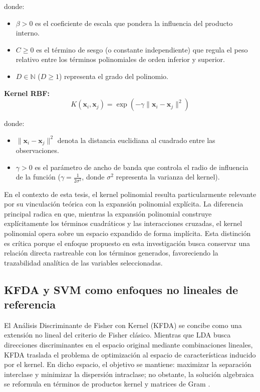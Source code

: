 donde:

\begin{itemize}
	\item $\beta > 0$ es el coeficiente de escala que pondera la influencia del producto interno.
	\item $C \ge 0$ es el término de sesgo (o constante independiente) que regula el peso relativo entre los términos polinomiales de orden inferior y superior.
	\item $D \in \mathbb{N}$ ($D \ge 1$) representa el grado del polinomio.
\end{itemize}

\noindent\textbf{Kernel RBF:}
\begin{equation}
	K(\mathbf{x}_i, \mathbf{x}_j) = \exp(-\gamma \|\mathbf{x}_i - \mathbf{x}_j\|^2)
	\label{eq:EMT18}
\end{equation}

donde:

\begin{itemize}
	\item $\|\mathbf{x}_i - \mathbf{x}_j\|^2$ denota la distancia euclidiana al cuadrado entre las observaciones.
	\item $\gamma > 0$ es el parámetro de ancho de banda que controla el radio de influencia de la función ($\gamma = \frac{1}{2\sigma^2}$, donde $\sigma^2$ representa la varianza del kernel).
\end{itemize}

En el contexto de esta tesis, el kernel polinomial resulta particularmente relevante por su vinculación teórica con la expansión polinomial explícita. La diferencia principal radica en que, mientras la expansión polinomial construye explícitamente los términos cuadráticos y las interacciones cruzadas, el kernel polinomial opera sobre un espacio expandido de forma implícita. Esta distinción es crítica porque el enfoque propuesto en esta investigación busca conservar una relación directa rastreable con los términos generados, favoreciendo la trazabilidad analítica de las variables seleccionadas.

\subsection{KFDA y SVM como enfoques no lineales de referencia}

El Análisis Discriminante de Fisher con Kernel (KFDA) se concibe como una extensión no lineal del criterio de Fisher clásico. Mientras que LDA busca direcciones discriminantes en el espacio original mediante combinaciones lineales, KFDA traslada el problema de optimización al espacio de características inducido por el kernel. En dicho espacio, el objetivo se mantiene: maximizar la separación interclase y minimizar la dispersión intraclase; no obstante, la solución algebraica se reformula en términos de productos kernel y matrices de Gram \cite{mika1999fisher}.

